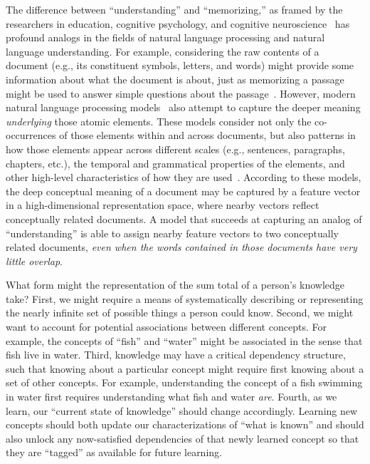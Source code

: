 \documentclass[10pt]{article}
\begin{document}
The difference between ``understanding'' and ``memorizing,'' as framed by the
researchers in education, cognitive psychology, and cognitive
neuroscience~\citep{Kato40, Gall10, ScotEtal13, HallGree08, Macl05} has
profound analogs in the fields of natural language processing and natural
language understanding. For example, considering the raw contents of a document
(e.g., its constituent symbols, letters, and words) might provide some
information about what the document is about, just as memorizing a passage
might be used to answer simple questions about the passage~\citep[e.g., whether
it might contain words related to furniture versus physics;][]{LandDuma97,
BleiEtal03, BleiLaff06}. However, modern natural language processing
models~\citep[e.g.,][]{MikoEtal13a, CerEtal18, BrowEtal20} also attempt to
capture the deeper meaning \textit{underlying} those atomic elements. These
models consider not only the co-occurrences of those elements within and across
documents, but also patterns in how those elements appear across different
scales (e.g., sentences, paragraphs, chapters, etc.), the temporal and
grammatical properties of the elements, and other high-level characteristics of
how they are used~\citep{Mann20, Mann21a}. According to these models, the deep
conceptual meaning of a document may be captured by a feature vector in a
high-dimensional representation space, where nearby vectors reflect
conceptually related documents. A model that succeeds at capturing an analog of
``understanding'' is able to assign nearby feature vectors to two conceptually
related documents, \textit{even when the words contained in those documents
have very little overlap}.

What form might the representation of the sum total of a person's knowledge
take? First, we might require a means of systematically describing or
representing the nearly infinite set of possible things a person could know.
Second, we might want to account for potential associations between different
concepts. For example, the concepts of ``fish'' and ``water'' might be
associated in the sense that fish live in water. Third, knowledge may have a
critical dependency structure, such that knowing about a particular concept
might require first knowing about a set of other concepts. For example,
understanding the concept of a fish swimming in water first requires
understanding what fish and water \textit{are}. Fourth, as we learn, our
``current state of knowledge'' should change accordingly. Learning new concepts
should both update our characterizations of ``what is known'' and should also
unlock any now-satisfied dependencies of that newly learned concept so that
they are ``tagged'' as available for future learning.
\end{document}
